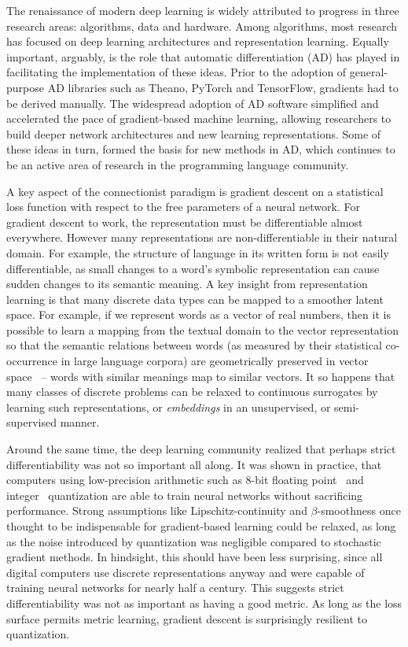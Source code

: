 \documentclass[12pt,initial,twoside,maitrise]{dms}
\numberwithin{equation}{section}
\numberwithin{table}{chapter}
\numberwithin{figure}{chapter}
\begin{document}
The renaissance of modern deep learning is widely attributed to progress in three research areas: algorithms, data and hardware. Among algorithms, most research has focused on deep learning architectures and representation learning. Equally important, arguably, is the role that automatic differentiation (AD) has played in facilitating the implementation of these ideas. Prior to the adoption of general-purpose AD libraries such as Theano, PyTorch and TensorFlow, gradients had to be derived manually. The widespread adoption of AD software simplified and accelerated the pace of gradient-based machine learning, allowing researchers to build deeper network architectures and new learning representations. Some of these ideas in turn, formed the basis for new methods in AD, which continues to be an active area of research in the programming language community.

A key aspect of the connectionist paradigm is gradient descent on a statistical loss function with respect to the free parameters of a neural network. For gradient descent to work, the representation must be differentiable almost everywhere. However many representations are non-differentiable in their natural domain. For example, the structure of language in its written form is not easily differentiable, as small changes to a word's symbolic representation can cause sudden changes to its semantic meaning. A key insight from representation learning is that many discrete data types can be mapped to a smoother latent space. For example, if we represent words as a vector of real numbers, then it is possible to learn a mapping from the textual domain to the vector representation so that the semantic relations between words (as measured by their statistical co-occurrence in large language corpora) are geometrically preserved in vector space~\citep{pennington2014glove} -- words with similar meanings map to similar vectors. It so happens that many classes of discrete problems can be relaxed to continuous surrogates by learning such representations, or \textit{embeddings} in an unsupervised, or semi-supervised manner.

Around the same time, the deep learning community realized that perhaps strict differentiability was not so important all along. It was shown in practice, that computers using low-precision arithmetic such as 8-bit floating point~\citep{wang2018training} and integer~\citep{jacob2018quantization} quantization are able to train neural networks without sacrificing performance. Strong assumptions like Lipschitz-continuity and $\beta$-smoothness once thought to be indispensable for gradient-based learning could be relaxed, as long as the noise introduced by quantization was negligible compared to stochastic gradient methods. In hindsight, this should have been less surprising, since all digital computers use discrete representations anyway and were capable of training neural networks for nearly half a century. This suggests strict differentiability was not as important as having a good metric. As long as the loss surface permits metric learning, gradient descent is surprisingly resilient to quantization.
\end{document}
